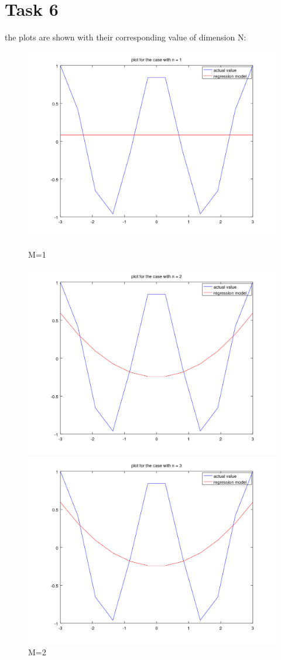 \documentclass[11pt]{article}
\theoremstyle{plain}
\theoremstyle{definition}
\begin{document}
\section{Task 6}
the plots are shown with their corresponding value of dimension N: 
\begin{figure}[!htb]
   \begin{minipage}{0.48\textwidth}
     \centering
     \includegraphics[width=.7\linewidth]{hw1_task6_fig1.png}
     \caption{M=1}\label{Fig:M=1}
   \end{minipage}\hfill
   \begin {minipage}{0.48\textwidth}
     \centering
     \includegraphics[width=.7\linewidth]{hw1_task6_fig2.png}
     \caption{M=2}\label{Fig:M=2}
   \end{minipage}\hfill 
   \begin{minipage}{0.48\textwidth}
     \centering
     \includegraphics[width=.7\linewidth]{hw1_task6_fig3.png}

\end{minipage}
\end{figure}
\end{document}
